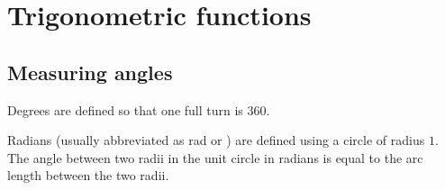 %

\section{Trigonometric functions} 
\subsection{Measuring angles}
\begin{definition}[Degrees]
Degrees are defined so that one full turn is $360$\degs.
\end{definition}

\begin{definition}[Radians]
Radians (usually abbreviated as rad or \rads) are defined using a circle of radius $1$. The angle between two radii in the unit circle in radians is equal to the arc length between the two radii.
\end{definition}

